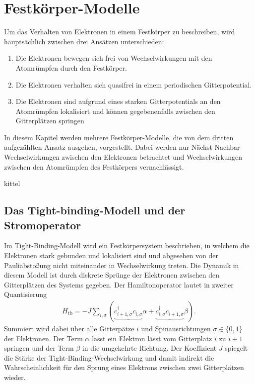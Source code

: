 \chapter{Festkörper-Modelle}
\label{ch:festkoerpermodelle}

Um das Verhalten von Elektronen in einem Festkörper zu beschreiben, wird hauptsächlich zwischen drei Ansätzen unterschieden:
\begin{enumerate}
  \item Die Elektronen bewegen sich frei von Wechselwirkungen mit den Atomrümpfen durch den Festkörper.
  \item Die Elektronen verhalten sich quasifrei in einem periodischen Gitterpotential.
  \item Die Elektronen sind aufgrund eines starken Gitterpotentials an den Atomrümpfen lokalisiert und können gegebenenfalls zwischen den Gitterplätzen springen
\end{enumerate}
In diesem Kapitel werden mehrere Festkörper-Modelle, die von dem dritten aufgezählten Ansatz ausgehen, vorgestellt.
Dabei werden nur Nächst-Nachbar-Wechselwirkungen zwischen den Elektronen betrachtet und Wechselwirkungen zwischen den Atomrümpfen des Festkörpers vernachlässigt.

kittel

\section{Das Tight-binding-Modell und der Stromoperator}

Im Tight-Binding-Modell wird ein Festkörpersystem beschrieben, in welchem die Elektronen stark gebunden und lokalisiert sind und abgesehen von der Pauliabstoßung nicht miteinander in Wechselwirkung treten.
Die Dynamik in diesem Modell ist durch diskrete Sprünge der Elektronen zwischen den Gitterplätzen des Systems gegeben. Der Hamiltonoperator lautet in zweiter Quantisierung
\begin{align}
  H_\text{tb} = -J \sum_{i,\sigma} (\underbrace{c_{i+1,\sigma}^{\dag}c_{i,\sigma}^{\phantom{\dag}}}{\alpha} + \underbrace{c_{i,\sigma}^{\dag}c_{i+1,\sigma}^{\phantom{\dag}}}{\beta}).
  \label{eqn:hamiltontb}
\end{align}
Summiert wird dabei über alle Gitterpätze $i$ und Spinausrichtungen $\sigma \in \{ 0,1 \}$ der Elektronen.
Der Term $\alpha$ lässt ein Elektron lässt vom Gitterplatz $i$ zu $i+1$ springen und der Term $\beta$ in die umgekehrte Richtung.
Der Koeffizient $J$ spiegelt die Stärke der Tight-Binding-Wechselwirkung und damit indirekt die Wahrscheinlichkeit für den Sprung eines Elektrons zwischen zwei Gitterplätzen wieder.

